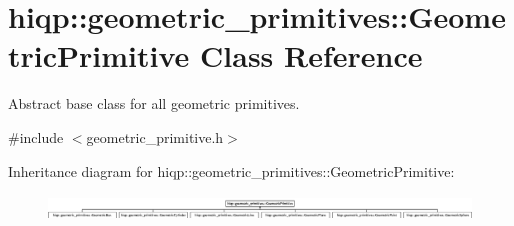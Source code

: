\hypertarget{classhiqp_1_1geometric__primitives_1_1GeometricPrimitive}{\section{hiqp\-:\-:geometric\-\_\-primitives\-:\-:Geometric\-Primitive Class Reference}
\label{classhiqp_1_1geometric__primitives_1_1GeometricPrimitive}
}


Abstract base class for all geometric primitives.  




{\ttfamily \#include $<$geometric\-\_\-primitive.\-h$>$}

Inheritance diagram for hiqp\-:\-:geometric\-\_\-primitives\-:\-:Geometric\-Primitive\-:\begin{figure}[H]
\begin{center}
\leavevmode
\includegraphics[height=0.678788cm]{classhiqp_1_1geometric__primitives_1_1GeometricPrimitive}
\end{center}
\end{figure}
